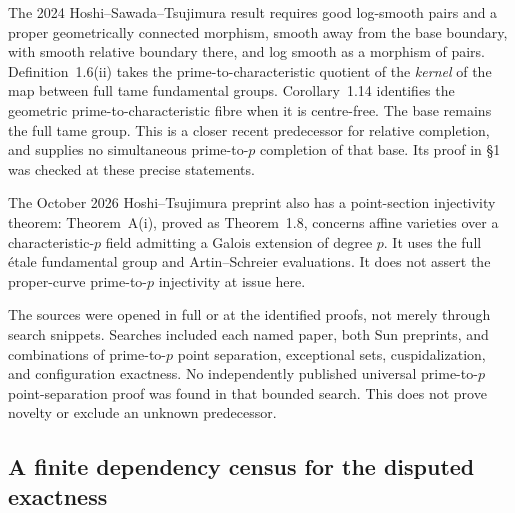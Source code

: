 \documentclass[11pt,a4paper]{article}
\begin{document}
The 2024 Hoshi--Sawada--Tsujimura result requires good log-smooth
pairs and a proper geometrically connected morphism, smooth away
from the base boundary, with smooth relative boundary there, and
log smooth as a morphism of pairs. Definition~1.6(ii) takes the
prime-to-characteristic quotient of the \emph{kernel} of the map
between full tame fundamental groups. Corollary~1.14 identifies
the geometric prime-to-characteristic fibre when it is centre-free.
The base remains the full tame group. This is a closer recent
predecessor for relative completion, and supplies no simultaneous
prime-to-$p$ completion of that base. Its proof in \S1 was checked
at these precise statements.
\citep[Definitions~1.1,1.3,1.6 and Corollary~1.14]{LA_HST2024}

The October 2026 Hoshi--Tsujimura preprint also has a point-section
injectivity theorem: Theorem~A(i), proved as Theorem~1.8, concerns
affine varieties over a characteristic-$p$ field admitting a Galois
extension of degree $p$. It uses the full \'etale fundamental group
and Artin--Schreier evaluations. It does not assert the proper-curve
prime-to-$p$ injectivity at issue here.
\citep[Theorem~A(i) and Theorem~1.8]{LA_HT2026}

The sources were opened in full or at the identified proofs, not merely
through search snippets. Searches included each named paper, both Sun
preprints, and combinations of prime-to-$p$ point separation, exceptional
sets, cuspidalization, and configuration exactness. No independently
published universal prime-to-$p$ point-separation proof was found in
that bounded search. This does not prove novelty or exclude an unknown
predecessor.\citep{LA_Mochizuki2007,LA_Mochizuki2014,LA_ST2009,LA_ST2017,LA_MT2008,LA_Stix2005,LA_Wakabayashi2016,LA_Sun2025,LA_SGA1,LA_BoggiZalesskii2019,LA_HST2024,LA_HT2026}

\subsection{A finite dependency census for the disputed exactness}
\end{document}
